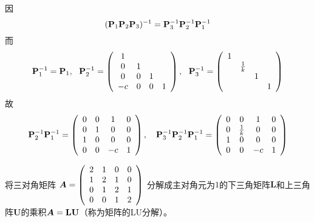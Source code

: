 \begin{frame}\ft{\secname}

\begin{jie}[续]
        因
        $$
        (\mathbf{P}_1\mathbf{P}_2\mathbf{P}_3)^{-1} = \mathbf{P}_3^{-1}\mathbf{P}_2^{-1}\mathbf{P}_1^{-1}
        $$
        \pause
        而
        $$
        \mathbf{P}_1^{-1} = \mathbf{P}_1, ~~
        \mathbf{P}_2^{-1} = \left(
        \begin{array}{cccc}
        1& & &  \\
        0&1& &  \\
        0&0&1& \\
        -c&0&0&1
        \end{array}
        \right), ~~
        \mathbf{P}_3^{-1} = \left(
        \begin{array}{cccc}
        1& & &  \\
        &\frac1k& &  \\
        & &1& \\
        & & &1
        \end{array}
        \right)
        $$    
        \pause
        故
        $$
        \mathbf{P}_2^{-1}\mathbf{P}_1^{-1} =   \left(
          \begin{array}{cccc}
            0&0&1&0 \\
            0&1&0&0 \\
            1&0&0&0 \\
            0&0&-c&1
          \end{array}
        \right), \quad  
        \mathbf{P}_3^{-1}\mathbf{P}_2^{-1}\mathbf{P}_1^{-1} =  \left(
          \begin{array}{cccc}
            0&0&1&0 \\
            0&\frac1k&0&0 \\
            1&0&0&0 \\
            0&0&-c&1
          \end{array}
        \right)
        $$
\end{jie}

\end{frame}


\begin{frame}\ft{\secname}
\begin{li}
  将三对角矩阵
  $
  \boldsymbol{A} = \left(
    \begin{array}{cccc}
      2 & 1 & 0 & 0\\
      1 & 2 & 1 & 0\\
      0 & 1 & 2 & 1\\
      0 & 0 & 1 & 2
    \end{array}
  \right)
  $
  分解成主对角元为$1$的下三角矩阵$\mathbf{L}$和上三角阵$\mathbf{U}$的乘积$\boldsymbol{A}=\mathbf{L}\mathbf{U}$（称为矩阵的LU分解）。
\end{li}
\end{frame}


